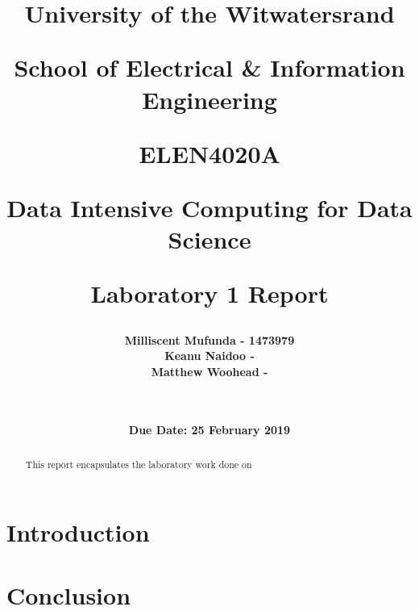 \documentclass[twocolumn, 11pt]{IEEEtran}
\title{ \Large \bf University of the Witwatersrand \centerline{School of Electrical \& Information Engineering} \newline \newline \newline \newline \newline \newline \LARGE \bf ELEN4020A  \centerline{Data Intensive Computing for Data Science} \newline \centerline{Laboratory 1 Report} \newline}
\date{\LARGE \bf Due Date: 25 February 2019}
\author{ \LARGE \bf Milliscent Mufunda - 1473979 \\ \LARGE \bf Keanu Naidoo -  \\ \LARGE \bf Matthew Woohead -  \\ \\ \\}
\begin{document}
\begin{titlingpage}

\maketitle

\end{titlingpage}

\setcounter{page}{1}

\begin{abstract}
    
This report encapsulates the laboratory work done on 
    
\end{abstract}

\section{Introduction}



\section{}




\subsection{}


\subsection{}


\section{}


\section{Conclusion}


\begin{thebibliography}{1}



\end{thebibliography}
\end{document}
